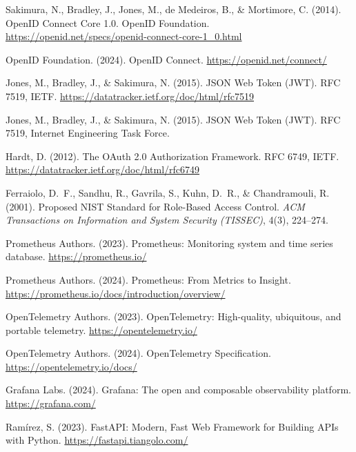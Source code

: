 Sakimura, N., Bradley, J., Jones, M., de Medeiros, B., \& Mortimore, C. (2014). OpenID Connect Core 1.0. OpenID Foundation. \url{https://openid.net/specs/openid-connect-core-1_0.html}

OpenID Foundation. (2024). OpenID Connect. \url{https://openid.net/connect/}

Jones, M., Bradley, J., \& Sakimura, N. (2015). JSON Web Token (JWT). RFC 7519, IETF. \url{https://datatracker.ietf.org/doc/html/rfc7519}

Jones, M., Bradley, J., \& Sakimura, N. (2015). JSON Web Token (JWT). RFC 7519, Internet Engineering Task Force.

Hardt, D. (2012). The OAuth 2.0 Authorization Framework. RFC 6749, IETF. \url{https://datatracker.ietf.org/doc/html/rfc6749}

Ferraiolo, D.~F., Sandhu, R., Gavrila, S., Kuhn, D.~R., \& Chandramouli, R. (2001). Proposed NIST Standard for Role-Based Access Control. \textit{ACM Transactions on Information and System Security (TISSEC)}, 4(3), 224--274.


Prometheus Authors. (2023). Prometheus: Monitoring system and time series database. \url{https://prometheus.io/}

Prometheus Authors. (2024). Prometheus: From Metrics to Insight. \url{https://prometheus.io/docs/introduction/overview/}

OpenTelemetry Authors. (2023). OpenTelemetry: High-quality, ubiquitous, and portable telemetry. \url{https://opentelemetry.io/}

OpenTelemetry Authors. (2024). OpenTelemetry Specification. \url{https://opentelemetry.io/docs/}

Grafana Labs. (2024). Grafana: The open and composable observability platform. \url{https://grafana.com/}


Ram{\'i}rez, S. (2023). FastAPI: Modern, Fast Web Framework for Building APIs with Python. \url{https://fastapi.tiangolo.com/}

